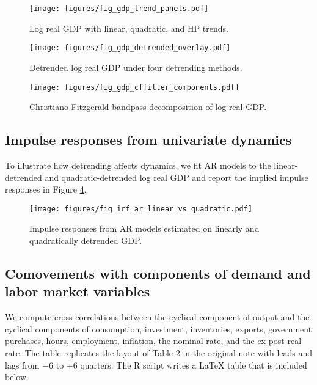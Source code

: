 \documentclass[11pt]{article}
\begin{document}
\begin{figure}[h]
\centering
\texttt{[image: figures/fig\_gdp\_trend\_panels.pdf]}
\caption{Log real GDP with linear, quadratic, and HP trends.}
\label{fig:gdp-trend}
\end{figure}

\begin{figure}[h]
\centering
\texttt{[image: figures/fig\_gdp\_detrended\_overlay.pdf]}
\caption{Detrended log real GDP under four detrending methods.}
\label{fig:gdp-detrended}
\end{figure}

\begin{figure}[h]
\centering
\texttt{[image: figures/fig\_gdp\_cffilter\_components.pdf]}
\caption{Christiano-Fitzgerald bandpass decomposition of log real GDP.}
\label{fig:gdp-cf}
\end{figure}

\subsection{Impulse responses from univariate dynamics}

To illustrate how detrending affects dynamics, we fit AR models to the linear-detrended and quadratic-detrended log real GDP and report the implied impulse responses in Figure \ref{fig:irf-ar}.

\begin{figure}[h]
\centering
\texttt{[image: figures/fig\_irf\_ar\_linear\_vs\_quadratic.pdf]}
\caption{Impulse responses from AR models estimated on linearly and quadratically detrended GDP.}
\label{fig:irf-ar}
\end{figure}

\subsection{Comovements with components of demand and labor market variables}

We compute cross-correlations between the cyclical component of output and the cyclical components of consumption, investment, inventories, exports, government purchases, hours, employment, inflation, the nominal rate, and the ex-post real rate. The table replicates the layout of Table 2 in the original note with leads and lags from $-6$ to $+6$ quarters. The R script writes a LaTeX table that is included below.

% 
\end{document}
